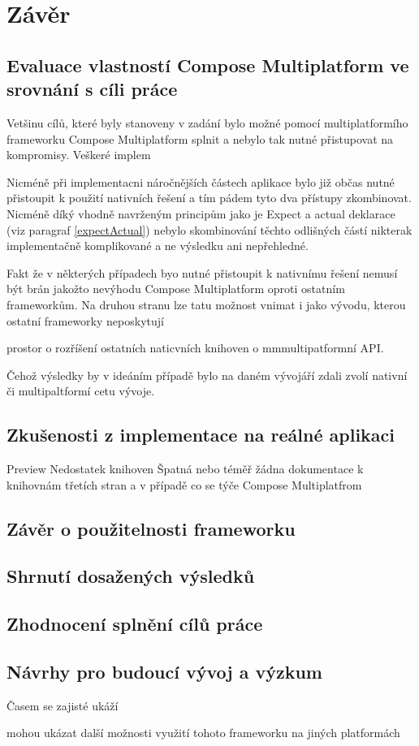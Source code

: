 \chapter{Závěr}

\section{Evaluace vlastností Compose Multiplatform ve srovnání s cíli práce}
Vetšinu cílů, které byly stanoveny v zadání bylo možné pomocí multiplatformího frameworku Compose Multiplatform splnit a nebylo tak
nutné přistupovat na kompromisy. Veškeré implem

Nicméně při implementacni náročnějších částech aplikace bylo již občas nutné přistoupit k použití nativních řešení a tím pádem tyto dva přístupy zkombinovat.
Nicméně díký vhodně navrženým principům jako je Expect a actual deklarace (viz paragraf \ref{expectActual}) nebylo skombinování těchto odlišných částí nikterak
implementačně komplikované a ne výsledku ani nepřehledné. 

Fakt že v některých případech byo nutné přistoupit k nativnímu řešení nemusí být brán jakožto nevýhodu Compose Multiplatform oproti ostatním frameworkům.
Na druhou stranu lze tatu možnost vnimat i jako vývodu, kterou ostatní frameworky neposkytují 

prostor o rozříšení ostatních naticvních knihoven o mmmultipatformní API. 

Čehož výsledky by v ideáním případě bylo na daném vývojáří zdali zvolí nativní či multipaltformí cetu vývoje. 

\section{Zkušenosti z implementace na reálné aplikaci}
Preview
Nedostatek knihoven
Špatná nebo téměř žádna dokumentace k knihovnám třetích stran a v případě co se týče Compose Multiplatfrom
\section{Závěr o použitelnosti frameworku}

\section{Shrnutí dosažených výsledků}
\section{Zhodnocení splnění cílů práce}
\section{Návrhy pro budoucí vývoj a výzkum}
Časem se zajisté ukáží

mohou ukázat další možnosti využití tohoto frameworku na jiných platformách


